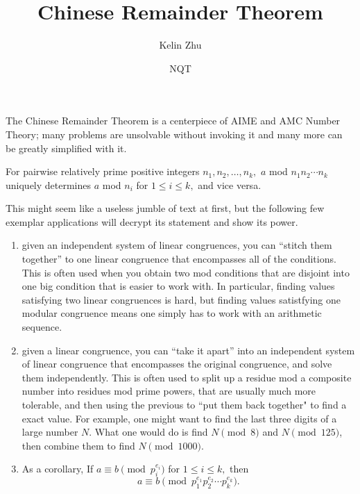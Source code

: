 \documentclass[mast]{lucky}
\title{Chinese Remainder Theorem}
\author{Kelin Zhu}
\date{NQT}
\begin{document}
\maketitle

The Chinese Remainder Theorem is a centerpiece of AIME and AMC Number Theory; many problems are unsolvable without invoking it and many more can be greatly simplified with it.

\begin{theo}
For pairwise relatively prime positive integers $n_1,n_2,\ldots,n_k,$ $a$ mod $n_1n_2\cdots n_k$ uniquely determines $a$ mod $n_i$ for $1\leq i\leq k,$ and vice versa.
\end{theo}

This might seem like a useless jumble of text at first, but the following few exemplar applications will decrypt its statement and show its power.
\begin{enumerate}
\item given an independent system of linear congruences, you can ``stitch them together'' to one linear congruence that encompasses all of the conditions. This is often used when you obtain two mod conditions that are disjoint into one big condition that is easier to work with. In particular, finding values satisfying two linear congruences is hard, but finding values satistfying one modular congruence means one simply has to work with an arithmetic sequence.
\item given a linear congruence, you can ``take it apart'' into an independent system of linear congruence that encompasses the original congruence, and solve them independently. This is often used to split up a residue mod a composite number into residues mod prime powers, that are usually much more tolerable, and then using the previous to ``put them back together" to find a exact value. For example, one might want to find the last three digits of a large number $N$. What one would do is find $N \pmod{8}$ and $N \pmod{125}$, then combine them to find $N\pmod{1000}$.
\item As a corollary, If $a\equiv b\pmod{p_i^{e_i}}$ for $1\leq i\leq k,$ then
\[a\equiv b\pmod{p_1^{e_1}p_2^{e_2}\cdots p_k^{e_k}}.\]
\end{enumerate}
\end{document}
